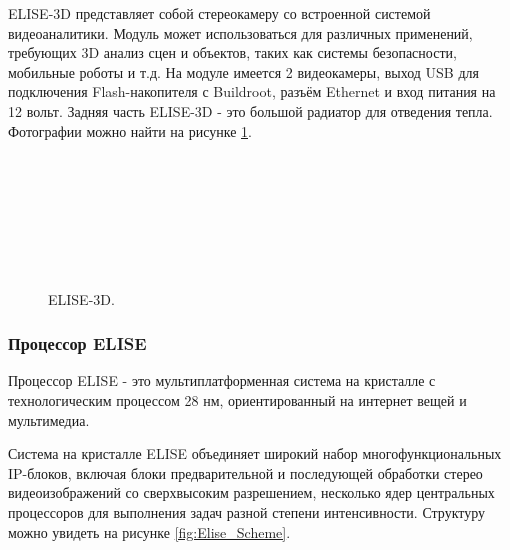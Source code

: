 \documentclass[14pt,a4paper]{scrartcl}
\begin{document}
		ELISE-3D представляет собой стереокамеру со встроенной системой видеоаналитики. Модуль может использоваться для различных применений, требующих 3D анализ сцен и объектов, таких как системы безопасности, мобильные роботы и т.д. На модуле имеется 2 видеокамеры, выход USB для подключения Flash-накопителя с Buildroot, разъём Ethernet и вход питания на 12 вольт. Задняя часть ELISE-3D - это большой радиатор для отведения тепла. Фотографии можно найти на рисунке \ref{fig:ELISE-3D}\cite{bib:Chuprikov_NIR}.
		
		\begin{figure}[H]
			\begin{minipage}[h]{0.47\linewidth}
				 \hspace{0.1cm} \\
			\end{minipage}
			\hfill
			\begin{minipage}[h]{0.47\linewidth}
				 \hspace{0.1cm} \\
			\end{minipage}
			\vfill
			\begin{minipage}[h]{0.47\linewidth}
				 \\
			\end{minipage}
			\hfill
			\begin{minipage}[h]{0.47\linewidth}
				 \\
			\end{minipage}
			\caption{ELISE-3D.}
			\label{fig:ELISE-3D}
		\end{figure}
	
		\subsubsection{Процессор ELISE}
		
			Процессор ELISE - это мультиплатформенная система на кристалле с технологическим процессом 28 нм, ориентированный на интернет вещей и мультимедиа.
			
			Система на кристалле ELISE объединяет широкий набор многофункциональных IP-блоков, включая блоки предварительной и последующей обработки стерео видеоизображений со сверхвысоким разрешением, несколько ядер центральных процессоров для выполнения задач разной степени интенсивности. Структуру можно увидеть на рисунке \ref{fig:Elise_Scheme}\cite{bib:Elise_CPU_Desc}.
			
\end{document}
